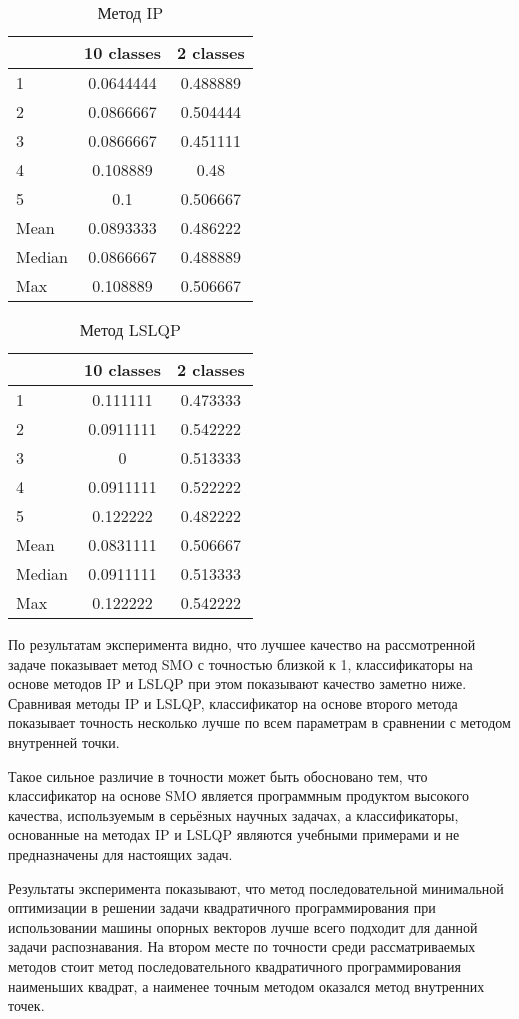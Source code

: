 \documentclass[12pt,a4paper]{article}
\begin{document}
\begin{table}[H]
    \centering
    \begin{tabular}{|l||c|c|}
        \hline
        & 10 classes & 2 classes \\\hline\hline
        1 & 0.0644444 & 0.488889 \\\hline
        2 & 0.0866667 & 0.504444 \\\hline
        3 & 0.0866667 & 0.451111 \\\hline
        4 & 0.108889 & 0.48 \\\hline
        5 & 0.1 & 0.506667 \\\hline
        Mean & 0.0893333 & 0.486222 \\\hline
        Median & 0.0866667 & 0.488889 \\\hline
        Max & 0.108889 & 0.506667 \\\hline
    \end{tabular}
    \caption{Метод IP}
\end{table}

\begin{table}[H]
    \centering
    \begin{tabular}{|l||c|c|}
        \hline
        & 10 classes & 2 classes \\\hline\hline
        1 & 0.111111 & 0.473333 \\\hline
        2 & 0.0911111 & 0.542222 \\\hline
        3 & 0 & 0.513333 \\\hline
        4 & 0.0911111 & 0.522222 \\\hline
        5 & 0.122222 & 0.482222 \\\hline
        Mean & 0.0831111 & 0.506667 \\\hline
        Median & 0.0911111 & 0.513333 \\\hline
        Max & 0.122222 & 0.542222 \\\hline
    \end{tabular}
    \caption{Метод LSLQP}
\end{table}

По результатам эксперимента видно, что лучшее качество на рассмотренной задаче показывает метод SMO с точностью близкой к 1, классификаторы на основе методов IP и LSLQP при этом показывают качество заметно ниже. Сравнивая методы IP и LSLQP, классификатор на основе второго метода показывает точность несколько лучше по всем параметрам в сравнении с методом внутренней точки.

Такое сильное различие в точности может быть обосновано тем, что классификатор на основе SMO является программным продуктом высокого качества, используемым в серьёзных научных задачах, а классификаторы, основанные на методах IP и LSLQP являются учебными примерами и не предназначены для настоящих задач.

Результаты эксперимента показывают, что метод последовательной минимальной оптимизации в решении задачи квадратичного программирования при использовании машины опорных векторов лучше всего подходит для данной задачи распознавания. На втором месте по точности среди рассматриваемых методов стоит метод последовательного квадратичного программирования наименьших квадрат, а наименее точным методом оказался метод внутренних точек.
\end{document}
